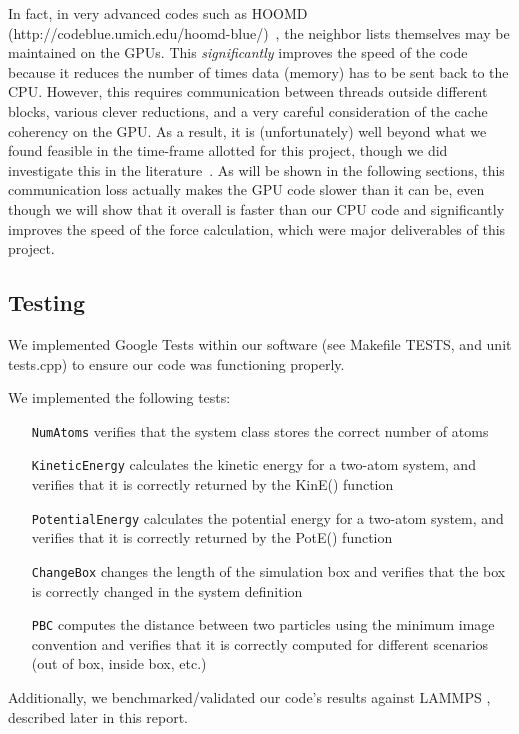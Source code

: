 \documentclass[12pt]{article}
\begin{document}
In fact, in very advanced codes such as HOOMD (http://codeblue.umich.edu/hoomd-blue/)~\cite{Anderson2008}, the neighbor lists themselves may be maintained on the GPUs.  This \emph{significantly} improves the speed of the code because it reduces the number of times data (memory) has to be sent back to the CPU. However, this requires communication between threads outside different blocks, various clever reductions, and a very careful consideration of the cache coherency on the GPU.  As a result, it is (unfortunately) well beyond what we found feasible in the time-frame allotted for this project, though we did investigate this in the literature~\cite{Lipscomb2012}. As will be shown in the following sections, this communication loss actually makes the GPU code slower than it can be, even though we will show that it overall is faster than our CPU code and significantly improves the speed of the force calculation, which were major deliverables of this project.

\subsection{Testing}

We implemented Google Tests within our software (see Makefile TESTS, and unit tests.cpp) to ensure our code was functioning properly.

We implemented the following tests:
	\begin{itemize}
	\item[\texttt{NumAtoms}] verifies that the system class stores the correct number of atoms
	\item[\texttt{KineticEnergy}] calculates the kinetic energy for a two-atom system, and verifies that it is correctly returned by the KinE() function
	\item[\texttt{PotentialEnergy}] calculates the potential energy for a two-atom system, and verifies that it is correctly returned by the PotE() function
	\item[\texttt{ChangeBox}] changes the length of the simulation box and verifies that the box is correctly changed in the system definition
	\item[\texttt{PBC}] computes the distance between two particles using the minimum image convention and verifies that it is correctly computed for different scenarios (out of box, inside box, etc.)
	\end{itemize}

Additionally, we benchmarked/validated our code's results against LAMMPS \cite{Plimpton1995}, described later in this report.
\end{document}
